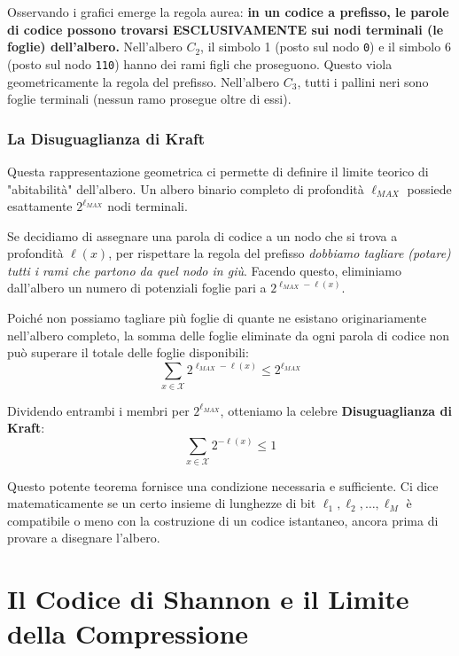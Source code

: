 Osservando i grafici emerge la regola aurea: \textbf{in un codice a prefisso, le parole di codice possono trovarsi ESCLUSIVAMENTE sui nodi terminali (le foglie) dell'albero.} 
Nell'albero $C_2$, il simbolo 1 (posto sul nodo \texttt{0}) e il simbolo 6 (posto sul nodo \texttt{110}) hanno dei rami figli che proseguono. Questo viola geometricamente la regola del prefisso. Nell'albero $C_3$, tutti i pallini neri sono foglie terminali (nessun ramo prosegue oltre di essi).

\subsubsection{La Disuguaglianza di Kraft}

Questa rappresentazione geometrica ci permette di definire il limite teorico di "abitabilità" dell'albero. 
Un albero binario completo di profondità $\ell_{MAX}$ possiede esattamente $2^{\ell_{MAX}}$ nodi terminali.

Se decidiamo di assegnare una parola di codice a un nodo che si trova a profondità $\ell(x)$, per rispettare la regola del prefisso \textit{dobbiamo tagliare (potare) tutti i rami che partono da quel nodo in giù}. Facendo questo, eliminiamo dall'albero un numero di potenziali foglie pari a $2^{\ell_{MAX} - \ell(x)}$.

Poiché non possiamo tagliare più foglie di quante ne esistano originariamente nell'albero completo, la somma delle foglie eliminate da ogni parola di codice non può superare il totale delle foglie disponibili:
\begin{equation}
\sum_{x \in \mathcal{X}} 2^{\ell_{MAX} - \ell(x)} \le 2^{\ell_{MAX}}
\end{equation}

Dividendo entrambi i membri per $2^{\ell_{MAX}}$, otteniamo la celebre \textbf{Disuguaglianza di Kraft}:
\begin{equation}
\boxed{ \sum_{x \in \mathcal{X}} 2^{-\ell(x)} \le 1 }
\end{equation}

Questo potente teorema fornisce una condizione necessaria e sufficiente. Ci dice matematicamente se un certo insieme di lunghezze di bit $\ell_1, \ell_2, \dots, \ell_M$ è compatibile o meno con la costruzione di un codice istantaneo, ancora prima di provare a disegnare l'albero.

\section{Il Codice di Shannon e il Limite della Compressione}

